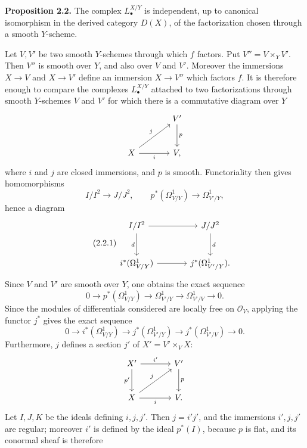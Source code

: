 \documentclass[11pt]{article}
\begin{document}
\textbf{Proposition 2.2.} The complex $L^{X/Y}_\bullet$ is independent, up to canonical isomorphism in the derived category $D(X)$, of the factorization chosen through a smooth $Y$-scheme.

Let $V,V'$ be two smooth $Y$-schemes through which $f$ factors. Put $V''=V\times_Y V'$. Then $V''$ is smooth over $Y$, and also over $V$ and $V'$. Moreover the immersions $X\to V$ and $X\to V'$ define an immersion $X\to V''$ which factors $f$. It is therefore enough to compare the complexes $L^{X/Y}_\bullet$ attached to two factorizations through smooth $Y$-schemes $V$ and $V'$ for which there is a commutative diagram over $Y$
\[
\begin{tikzcd}[column sep=large,row sep=large]
& V' \arrow[d,"p"]\\
X \arrow[ur,"j"] \arrow[r,"i"'] & V,
\end{tikzcd}
\]
where $i$ and $j$ are closed immersions, and $p$ is smooth. Functoriality then gives homomorphisms
\[
I/I^2\longrightarrow J/J^2,
\qquad
p^*(\Omega^1_{V/Y})\longrightarrow\Omega^1_{V'/Y},
\]
hence a diagram
\begin{equation}\tag{2.2.1}
\begin{tikzcd}[column sep=large,row sep=large]
I/I^2 \arrow[r] \arrow[d,"d"'] & J/J^2 \arrow[d,"d"]\\
i^*(\Omega^1_{V/Y}) \arrow[r] & j^*(\Omega^1_{V'/Y}).
\end{tikzcd}
\end{equation}
Since $V$ and $V'$ are smooth over $Y$, one obtains the exact sequence
\[
0\longrightarrow p^*(\Omega^1_{V/Y})\longrightarrow\Omega^1_{V'/Y}
\longrightarrow\Omega^1_{V'/V}\longrightarrow0.
\]
Since the modules of differentials considered are locally free on $\mathcal O_V$, applying the functor $j^*$ gives the exact sequence
\begin{equation}\tag{2.2.2}
0\longrightarrow i^*(\Omega^1_{V/Y})\longrightarrow j^*(\Omega^1_{V'/Y})
\longrightarrow j^*(\Omega^1_{V'/V})\longrightarrow0.
\end{equation}
Furthermore, $j$ defines a section $j'$ of $X'=V'\times_V X$:
\[
\begin{tikzcd}[column sep=large,row sep=large]
X' \arrow[r,"i'"] \arrow[d,"p'"'] & V' \arrow[d,"p"]\\
X \arrow[r,"i"'] \arrow[ur,"j"] & V .
\end{tikzcd}
\]
Let $I,J,K$ be the ideals defining $i,j,j'$. Then $j=i'j'$, and the immersions $i',j,j'$ are regular; moreover $i'$ is defined by the ideal $p^*(I)$, because $p$ is flat, and its conormal sheaf is therefore
\end{document}
